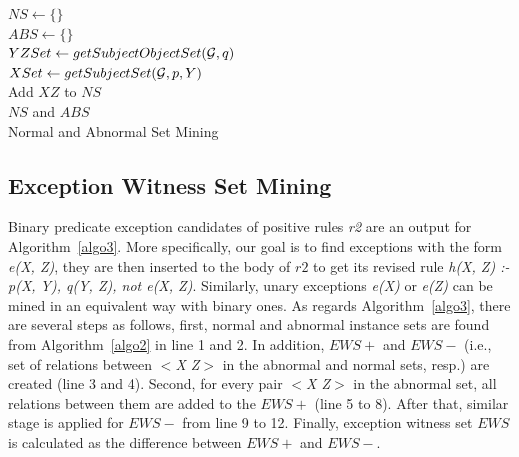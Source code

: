 \IncMargin{1.5em}
\begin{algorithm}[H]
\DontPrintSemicolon
\SetAlgoLined
{}
\BlankLine
$NS \leftarrow \{\}$\\
$ABS \leftarrow \{\}$\\
$YZSet \leftarrow getSubjectObjectSet(\mathcal{G}, q)$\\
\BlankLine
{} {
    \BlankLine
	$XSet \leftarrow getSubjectSet(\mathcal{G}, p, Y)$\\
	 {
	 {
		Add $XZ$ to $NS$\\
	}
	}
}
\BlankLine
\Return $NS$ and $ABS$\\
\caption{Normal and Abnormal Set Mining}
\label{algo2}
\end{algorithm}
\DecMargin{1.5em}

\subsection{Exception Witness Set Mining}

Binary predicate exception candidates of positive rules \textit{r2} are an output for Algorithm~\ref{algo3}. More specifically, our goal is to find exceptions with the form \textit{e(X, Z)}, they are then inserted to the body of $r2$ to get its revised rule \textit{h(X, Z) :- p(X, Y), q(Y, Z), not e(X, Z)}. Similarly, unary exceptions \textit{e(X)} or \textit{e(Z)} can be mined in an equivalent way with binary ones. As regards Algorithm~\ref{algo3}, there are several steps as follows, first, normal and abnormal instance sets are found from Algorithm~\ref{algo2} in line 1 and 2. In addition, $EWS+$ and $EWS-$ (i.e., set of relations between \textit{$<$X Z$>$} in the abnormal and normal sets, resp.) are created (line 3 and 4). Second, for every pair \textit{$<$X Z$>$} in the abnormal set, all relations between them are added to the $EWS+$ (line 5 to 8). After that, similar stage is applied for $EWS-$ from line 9 to 12. Finally, exception witness set $EWS$ is calculated as the difference between $EWS+$ and $EWS-$.

